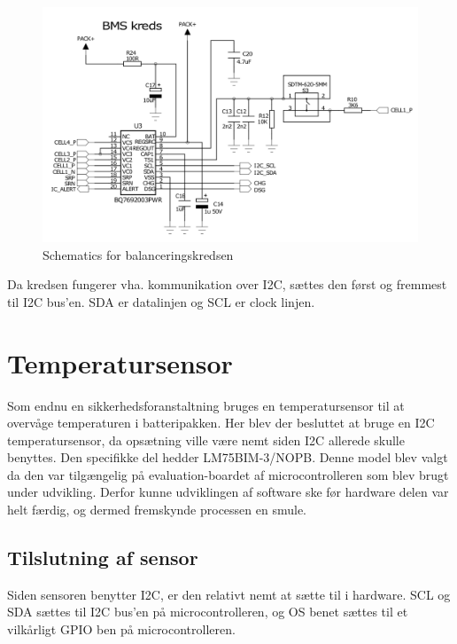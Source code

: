 \begin{figure}[h]
	\centering
	\includegraphics[width=15cm]{billeder/bms_ic_sch.png}
	\caption{Schematics for balanceringskredsen}
	\label{fig:temp_sensor}
\end{figure}

Da kredsen fungerer vha. kommunikation over I2C, sættes den først og fremmest til I2C bus'en. SDA er datalinjen og SCL er clock linjen. \\


\section{Temperatursensor} \label{sec:temperatur}
Som endnu en sikkerhedsforanstaltning bruges en temperatursensor til at overvåge temperaturen i batteripakken. Her blev der besluttet at bruge en I2C temperatursensor, da opsætning ville være nemt siden I2C allerede skulle benyttes. Den specifikke del hedder LM75BIM-3/NOPB. Denne model blev valgt da den var tilgængelig på evaluation-boardet af microcontrolleren som blev brugt under udvikling. Derfor kunne udviklingen af software ske før hardware delen var helt færdig, og dermed fremskynde processen en smule. \\

\subsection{Tilslutning af sensor}
Siden sensoren benytter I2C, er den relativt nemt at sætte til i hardware. SCL og SDA sættes til I2C bus'en på microcontrolleren, og OS benet sættes til et vilkårligt GPIO ben på microcontrolleren. 

